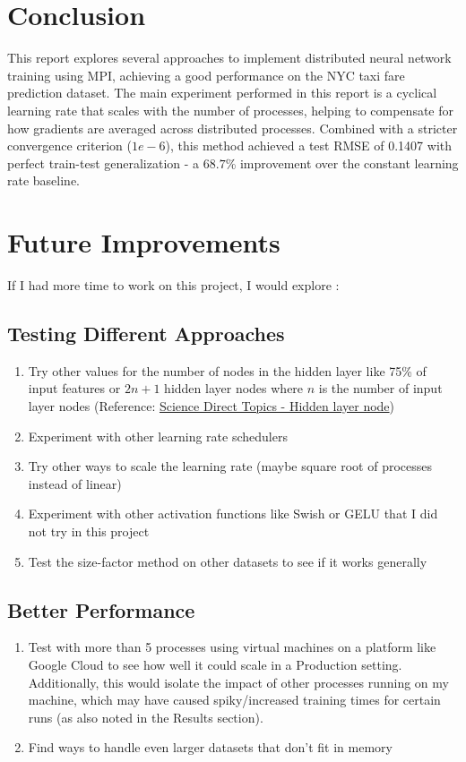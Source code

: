 \documentclass{article}
\begin{document}
\section{Conclusion}

This report explores several approaches to implement distributed neural network training using MPI, achieving a good performance on the NYC taxi fare prediction dataset. The main experiment performed in this report is a cyclical learning rate that scales with the number of processes, helping to compensate for how gradients are averaged across distributed processes. Combined with a stricter convergence criterion ($1e-6$), this method achieved a test RMSE of 0.1407 with perfect train-test generalization - a $68.7$\% improvement over the constant learning rate baseline.

\section{Future Improvements}

If I had more time to work on this project, I would explore :

\subsection{Testing Different Approaches}
\begin{enumerate}
    \item Try other values for the number of nodes in the hidden layer like 75\% of input features or $2n+1$ hidden layer nodes where $n$ is the number of input layer nodes (Reference: \href{https://www.sciencedirect.com/topics/engineering/hidden-layer-node}{Science Direct Topics - Hidden layer node})
    \item Experiment with other learning rate schedulers
    \item Try other ways to scale the learning rate (maybe square root of processes instead of linear)
    \item Experiment with other activation functions like Swish or GELU that I did not try in this project
    \item Test the size-factor method on other datasets to see if it works generally
\end{enumerate}

\subsection{Better Performance}
\begin{enumerate}
    \item Test with more than 5 processes using virtual machines on a platform like Google Cloud to see how well it could scale in a Production setting. Additionally, this would isolate the impact of other processes running on my machine, which may have caused spiky/increased training times for certain runs (as also noted in the Results section). 
    \item Find ways to handle even larger datasets that don't fit in memory
\end{enumerate}
\end{document}
